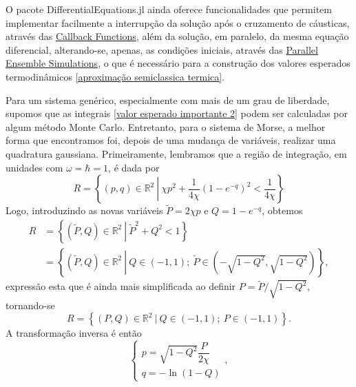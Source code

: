 \documentclass[
	12pt,
	oneside,			%
	a4paper,			%
	english,			%
	brazil				%
	]{abntex2}
\theoremstyle{definition}
\begin{document}
\begin{apendicesenv}
O pacote DifferentialEquations.jl ainda oferece funcionalidades que permitem implementar facilmente a interrupção da solução após o cruzamento de cáusticas, através das \href{https://diffeq.sciml.ai/stable/features/callback_functions/}{Callback Functions}, além da solução, em paralelo, da mesma equação diferencial, alterando-se, apenas, as condições iniciais, através das \href{https://diffeq.sciml.ai/stable/features/ensemble/}{Parallel Ensemble Simulations}, o que é necessário para a construção dos valores esperados termodinâmicos \eqref{aproximação semiclassica termica}.

Para um sistema genérico, especialmente com mais de um grau de liberdade, supomos que as integrais \eqref{valor esperado importante 2} podem ser calculadas por algum método Monte Carlo. Entretanto, para o sistema de Morse, a melhor forma que encontramos foi, depois de uma mudança de variáveis, realizar uma quadratura gaussiana. Primeiramente, lembramos que a região de integração, em unidades com $\omega=\hbar=1$, é dada por
\begin{equation}
    R = \left\{ (p,q) \in \mathbb{R}^2 \ \left| \ \chi p^2 + \frac{1}{4\chi} \left( 1-e^{-q} \right)^2 < \frac{1}{4\chi} \right. \right\}
\end{equation}
Logo, introduzindo as novas variáveis $\tilde{P} = 2\chi p$ e $Q = 1-e^{-q} $, obtemos
\begin{equation}
    \begin{aligned}
        R &= \left\{ \left(\tilde{P},Q\right) \in \mathbb{R}^2 \ \left| \ \tilde{P}^2 + Q^2 < 1 \right. \right\} \\ &= \left\{ \left(\tilde{P},Q\right) \in \mathbb{R}^2 \ \left| \ Q \in \left( -1,1 \right); \  \tilde{P} \in \left( -\sqrt{1-Q^2},\sqrt{1-Q^2} \right) \right. \right\},
    \end{aligned}
\end{equation}
expressão esta que é ainda mais simplificada ao definir $P = \tilde{P}/\sqrt{1-Q^2}$, tornando-se
\begin{equation}
    R = \left\{ \left(P,Q\right) \in \mathbb{R}^2 \ \left| \ Q \in \left( -1,1 \right); \  P \in \left( -1,1 \right) \right. \right\}.
\end{equation}
A transformação inversa é então
\begin{equation}
    \begin{cases}
       p = \sqrt{1-Q^2}\dfrac{P}{2\chi} \\
       q = -\ln \left( 1-Q \right)
    \end{cases},

\end{equation}
\end{apendicesenv}
\end{document}
